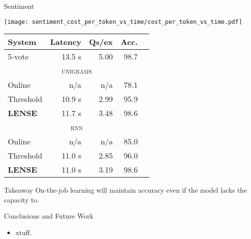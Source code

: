 \begin{block}{Sentiment}
    \begin{minipage}[t]{.43\columnwidth}
      \colorbox{white}{
      \texttt{[image: sentiment\_cost\_per\_token\_vs\_time/cost\_per\_token\_vs\_time.pdf]}
      }
    \end{minipage}
    \quad
    \begin{minipage}[t]{.45\columnwidth}
      \begin{tabular}[b]{l  r  r  r  r}
          \textbf{System} & \textbf{Latency} & \textbf{Qs/ex} & \textbf{Acc.} \\ \hline
          5-vote & 13.5 s & 5.00 & 98.7 \\ %
          \multicolumn{5}{c}{\textsc{unigrams}} \\ \hline
          Online & n/a & n/a & 78.1 \\ %
          Threshold & 10.9 s & 2.99 & 95.9 \\ %
          \textbf{LENSE} & 11.7 s & 3.48 & 98.6 \\ %
          \multicolumn{5}{c}{\textsc{rnn}} \\ \hline
          Online & n/a & n/a & 85.0 \\ %
          Threshold & 11.0 s & 2.85 & 96.0 \\ %
          \textbf{LENSE} & 11.0 s & 3.19 & 98.6 \\%
      \end{tabular}
    \end{minipage}%

  \begin{exampleblock}{Takeaway}
      On-the-job learning will maintain accuracy even if the model lacks the capacity to.
  \end{exampleblock}
\end{block}
\vfill

\begin{block}{Conclusions and Future Work}
  \begin{itemize}
    \item xtuff.
  \end{itemize}
\end{block}
\vfill

